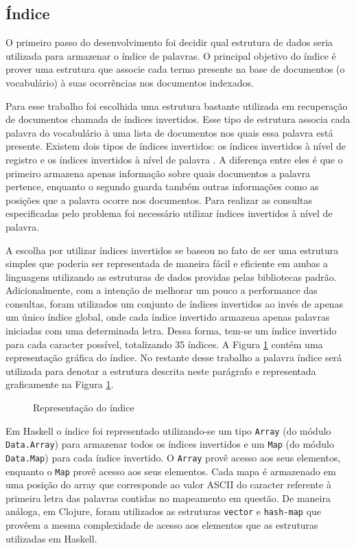 \subsection{Índice}

O primeiro passo do desenvolvimento foi decidir qual estrutura de dados seria utilizada para armazenar o índice de palavras. O principal objetivo do índice é prover uma estrutura que associe cada termo presente na base de documentos (o vocabulário) à suas ocorrências nos documentos indexados.

Para esse trabalho foi escolhida uma estrutura bastante utilizada em recuperação de documentos chamada de índices invertidos. Esse tipo de estrutura associa cada palavra  do vocabulário à uma lista de documentos nos quais essa palavra está presente. Existem dois tipos de índices invertidos: os índices invertidos à nível de registro e os índices invertidos à nível de palavra \cite{baeza1999modern}. A diferença entre eles é que o primeiro armazena apenas informação sobre quais documentos a palavra pertence, enquanto o segundo guarda também outras informações como as posições que a palavra ocorre nos documentos. Para realizar as consultas especificadas pelo problema foi necessário utilizar índices invertidos à nível de palavra.

A escolha por utilizar índices invertidos se baseou no fato de ser uma estrutura simples que poderia ser representada de maneira fácil e eficiente em ambas a linguagens utilizando as estruturas de dados providas pelas bibliotecas padrão. Adicionalmente, com a intenção de melhorar um pouco a performance das consultas, foram utilizados um conjunto de índices invertidos ao invés de apenas um único índice global, onde cada índice invertido armazena apenas palavras iniciadas com uma determinada letra. Dessa forma, tem-se um índice invertido para cada caracter possível, totalizando 35 índices. A Figura \ref{fig:indice} contém uma representação gráfica do índice. No restante desse trabalho a palavra índice será utilizada para denotar a estrutura descrita neste parágrafo e representada graficamente na Figura \ref{fig:indice}.

\begin{figure}[h]
 \centering
 \def\svgwidth{0.6\columnwidth}
 
 \caption{Representação do índice}
 \label{fig:indice}
\end{figure}


Em Haskell o índice foi representado utilizando-se um tipo \verb|Array| (do módulo \verb|Data.Array|) para armazenar todos os índices invertidos e um \verb|Map| (do módulo \verb|Data.Map|) para cada índice invertido. O \verb|Array| provê acesso  aos seus elementos, enquanto o \verb|Map| provê acesso  aos seus elementos. Cada mapa é armazenado em uma posição do array que corresponde ao valor ASCII do caracter referente à primeira letra das palavras contidas no mapeamento em questão. De maneira análoga, em Clojure, foram utilizados as estruturas \verb|vector| e \verb|hash-map| que provêem a mesma complexidade de acesso aos elementos que as estruturas utilizadas em Haskell.

